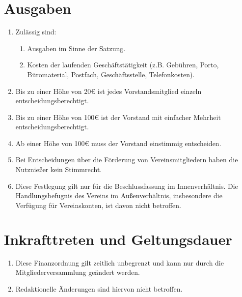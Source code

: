 \documentclass[12pt,a4paper,titlepage]{scrartcl}
\begin{document}
\section{Ausgaben}
\begin{enumerate}
\item Zulässig sind:
	\begin{enumerate}
	\item Ausgaben im Sinne der Satzung.
	\item Kosten der laufenden Geschäftstätigkeit (z.B. Gebühren, Porto, Büromaterial, 
Postfach, Geschäftsstelle, Telefonkosten).
	\end{enumerate}
	\item Bis zu einer Höhe von 20€ ist jedes Vorstandsmitglied einzeln entscheidungsberechtigt. 
	\item Bis zu einer Höhe von 100€ ist der Vorstand mit einfacher Mehrheit entscheidungsberechtigt.
	\item Ab einer Höhe von 100€ muss der Vorstand einstimmig entscheiden.
	\item Bei Entscheidungen über die Förderung von Vereinsmitgliedern haben die 
Nutznießer kein Stimmrecht. 
	\item Diese Festlegung gilt nur für die Beschlussfassung im Innenverhältnis. Die 
Handlungsbefugnis des Vereins im Außenverhältnis, insbesondere die Verfügung für 
Vereinskonten, ist davon nicht betroffen.
\end{enumerate}
 
\section{Inkrafttreten und Geltungsdauer }
\begin{enumerate}
\item Diese Finanzordnung gilt zeitlich unbegrenzt und kann nur durch die 
Mitgliederversammlung geändert werden. 
\item Redaktionelle Änderungen sind hiervon nicht betroffen. 
\end{enumerate}
\end{document}
